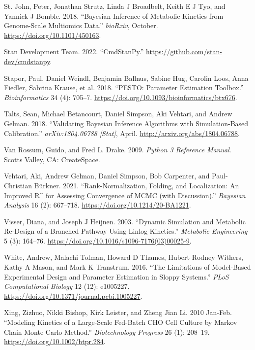 \documentclass[
  letterpaper,
  DIV=11,
  numbers=noendperiod]{scrartcl}
\newlength{\cslhangindent}
\newlength{\cslentryspacingunit} %
\newenvironment{CSLReferences}[2] %
 {%
  \setlength{\parindent}{0pt}
  \ifodd #1
  \let\oldpar\par
  \def\par{\hangindent=\cslhangindent\oldpar}
  \fi
  \setlength{\parskip}{#2\cslentryspacingunit}
 }%
 {}
\begin{document}
\begin{CSLReferences}{1}{0}
\leavevmode{}%
St. John, Peter, Jonathan Strutz, Linda J Broadbelt, Keith E J Tyo, and
Yannick J Bomble. 2018. {``Bayesian Inference of Metabolic Kinetics from
Genome-Scale Multiomics Data.''} \emph{bioRxiv}, October.
\url{https://doi.org/10.1101/450163}.

\leavevmode{}%
Stan Development Team. 2022. {``{CmdStanPy}.''}
\url{https://github.com/stan-dev/cmdstanpy}.

\leavevmode{}%
Stapor, Paul, Daniel Weindl, Benjamin Ballnus, Sabine Hug, Carolin Loos,
Anna Fiedler, Sabrina Krause, et al. 2018. {``{PESTO}: Parameter
Estimation Toolbox.''} \emph{Bioinformatics} 34 (4): 705--7.
\url{https://doi.org/10.1093/bioinformatics/btx676}.

\leavevmode{}%
Talts, Sean, Michael Betancourt, Daniel Simpson, Aki Vehtari, and Andrew
Gelman. 2018. {``Validating {Bayesian Inference Algorithms} with
{Simulation-Based Calibration}.''} \emph{arXiv:1804.06788 {[}Stat{]}},
April. \url{http://arxiv.org/abs/1804.06788}.

\leavevmode{}%
Van Rossum, Guido, and Fred L. Drake. 2009. \emph{Python 3 {Reference
Manual}}. {Scotts Valley, CA}: {CreateSpace}.

\leavevmode{}%
Vehtari, Aki, Andrew Gelman, Daniel Simpson, Bob Carpenter, and
Paul-Christian Bürkner. 2021. {``Rank-{Normalization}, {Folding}, and
{Localization}: {An Improved R\^{}} for {Assessing Convergence} of
{MCMC} (with {Discussion}).''} \emph{Bayesian Analysis} 16 (2):
667--718. \url{https://doi.org/10.1214/20-BA1221}.

\leavevmode{}%
Visser, Diana, and Joseph J Heijnen. 2003. {``Dynamic Simulation and
Metabolic Re-Design of a Branched Pathway Using Linlog Kinetics.''}
\emph{Metabolic Engineering} 5 (3): 164--76.
\url{https://doi.org/10.1016/s1096-7176(03)00025-9}.

\leavevmode{}%
White, Andrew, Malachi Tolman, Howard D Thames, Hubert Rodney Withers,
Kathy A Mason, and Mark K Transtrum. 2016. {``The Limitations of
Model-Based Experimental Design and Parameter Estimation in Sloppy
Systems.''} \emph{PLoS Computational Biology} 12 (12): e1005227.
\url{https://doi.org/10.1371/journal.pcbi.1005227}.

\leavevmode{}%
Xing, Zizhuo, Nikki Bishop, Kirk Leister, and Zheng Jian Li. 2010
Jan-Feb. {``Modeling Kinetics of a Large-Scale Fed-Batch {CHO} Cell
Culture by {Markov} Chain {Monte Carlo} Method.''} \emph{Biotechnology
Progress} 26 (1): 208--19. \url{https://doi.org/10.1002/btpr.284}.

\end{CSLReferences}
\end{document}
